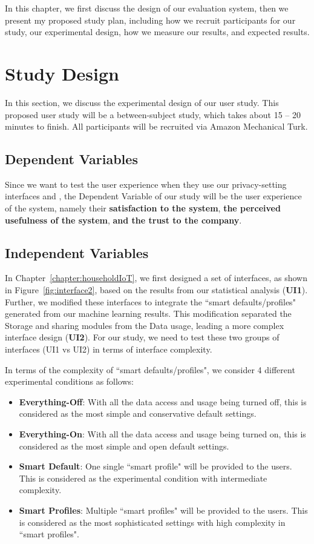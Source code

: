 In this chapter, we first discuss the design of our evaluation system, then we present my proposed study plan, including how we recruit participants for our study, our experimental design, how we measure our results, and expected results.

\section{Study Design}

In this section, we discuss the experimental design of our user study. This proposed user study will be a between-subject study, which takes about 15 -- 20 minutes to finish. All participants will be recruited via Amazon Mechanical Turk.

\subsection{Dependent Variables}
Since we want to test the user experience when they use our privacy-setting interfaces and , the Dependent Variable of our study will be the user experience of the system, namely their \textbf{satisfaction to the system}, \textbf{the perceived usefulness of the system}, \textbf{and the trust to the company}. 

\subsection{Independent Variables}
In Chapter~\ref{chapter:householdIoT},  we first designed a set of interfaces, as shown in Figure~\ref{fig:interface2}, based on the results from our statistical analysis (\textbf{UI1}). Further, we modified these interfaces to integrate the ``smart defaults/profiles" generated from our machine learning results. This modification separated the Storage and sharing modules from the Data usage, leading a more complex interface design (\textbf{UI2}). For our study, we need to test these two groups of interfaces (UI1 vs UI2) in terms of interface complexity.

In terms of the complexity of ``smart defaults/profiles", we consider 4 different experimental conditions as follows:
\begin{itemize}
	\item \textbf{Everything-Off}: With all the data access and usage being turned off, this is considered as the most simple and conservative default settings.
	\item \textbf{Everything-On}: With all the data access and usage being turned on, this is considered as the most simple and open default settings.
	\item \textbf{Smart Default}: One single ``smart profile" will be provided to the users. This is considered as the experimental condition with intermediate complexity.
	\item \textbf{Smart Profiles}: Multiple ``smart profiles" will be provided to the users. This is considered as the most sophisticated settings with high complexity in ``smart profiles".
\end{itemize}

